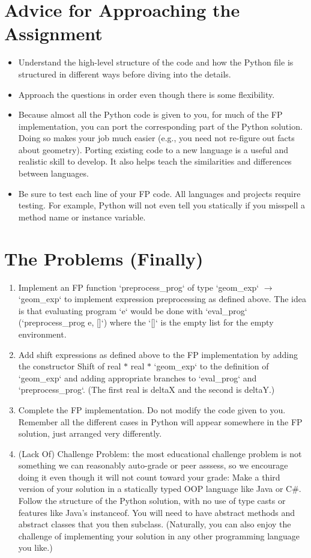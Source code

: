 \documentclass[a4paper,12pt]{article}
\begin{document}
\section*{Advice for Approaching the Assignment}
\begin{itemize}
  \item Understand the high-level structure of the code and how the Python file is structured in different ways before diving into the details.
  \item Approach the questions in order even though there is some flexibility.
  \item Because almost all the Python code is given to you, for much of the FP implementation, you can port the corresponding part of the Python solution. Doing so makes your job much easier (e.g., you need not re-figure out facts about geometry). Porting existing code to a new language is a useful and realistic skill to develop. It also helps teach the similarities and differences between languages.
  \item Be sure to test each line of your FP code. All languages and projects require testing. For example, Python will not even tell you statically if you misspell a method name or instance variable.
\end{itemize}

\section*{The Problems (Finally)}
\begin{enumerate}
  \item Implement an FP function `preprocess\_prog` of type `geom\_exp` $\rightarrow$ `geom\_exp` to implement expression preprocessing as defined above. The idea is that evaluating program `e` would be done with `eval\_prog` (`preprocess\_prog e, []`) where the `[]` is the empty list for the empty environment.

  \item Add shift expressions as defined above to the FP implementation by adding the constructor Shift of real $*$ real $*$ `geom\_exp` to the definition of `geom\_exp` and adding appropriate branches to `eval\_prog` and `preprocess\_prog`. (The first real is deltaX and the second is deltaY.)

  \item Complete the FP implementation. Do not modify the code given to you. Remember all the different cases in Python will appear somewhere in the FP solution, just arranged very differently.

  \item (Lack Of) Challenge Problem: the most educational challenge problem is not something we can reasonably auto-grade or peer asssess, so we encourage doing it even though it will not count toward your grade: Make a third version of your solution in a statically typed OOP language like Java or C\#. Follow the structure of the Python solution, with no use of type casts or features like Java's instanceof. You will need to have abstract methods and abstract classes that you then subclass. (Naturally, you can also enjoy the challenge of implementing your solution in any other programming language you like.)
\end{enumerate}
\end{document}

